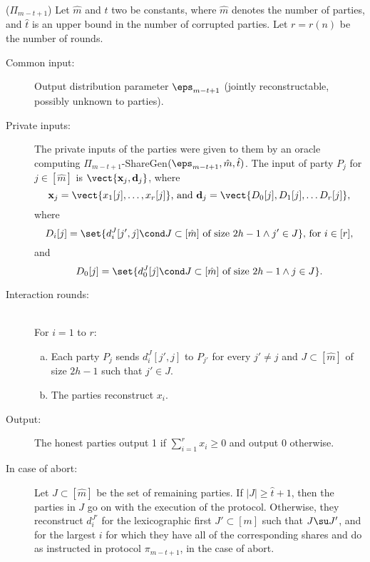 \begin{protocol}($\Pi_{m-t+1}$)\label{protocol:reductionbase}
Let $\hat{m}$ and $\hat{t}$ two be constants, where $\hat{m}$ denotes the number of parties, and $\hat{t}$ is an upper bound in the number of corrupted parties. Let $r=r(n)$ be the number of rounds.
\begin{description}
\item[Common input:] Output distribution parameter $\eps_{m-t+1}$ (jointly reconstructable, possibly unknown to parties).
\item[Private inputs:] The private inputs of the parties were given to them by an oracle computing $\Pi_{m-t+1}$-ShareGen$(\eps_{m-t+1},\hat{m},\hat{t})$.
The input of party $P_j$ for $j\in[\hat{m}]$ is $\vect{\textbf{x}_j,\textbf{d}_j}$, where 
$$\textbf{x}_j=\vect{x_1[j],\ldots,x_r[j]}\text{, and }\textbf{d}_j=\vect{D_0[j],D_1[j],\ldots D_r[j]},$$
where 
$$D_i[j]=\set{d^J_i[j',j]\cond J\subset[\hat{m}]\text{ of size } 2h-1 \wedge j'\in J}\text{, for }i\in[r],$$
 and 
$$D_0[j]=\set{d^J_0[j]\cond J\subset[\hat{m}]\text{ of size }2h-1 \wedge j\in J}.$$
\item[Interaction rounds:]~\\
		For $i=1$ to $r$:
		\begin{enumerate}[(a)]
			\item Each party $P_j$ sends $d^J_i[j',j]$ to $P_{j'}$ for every $j'\ne j$ and $J\subset[\hat{m}]$ of size $2h-1$ such that $j'\in J$.
			\item The parties reconstruct $x_i$.
		\end{enumerate}
	\item[Output:] The honest parties output 1 if $\sum_{i=1}^r {x_i}\geq0$ and output 0 otherwise.
	\item[In case of abort:]
		Let $J\subset[\hat{m}]$ be the set of remaining parties. If $|J|\geq\hat{t}+1$, then the parties in $J$ go on with the execution of the protocol. Otherwise, they reconstruct $d_i^{J'}$ for the lexicographic first $J'\subset[m]$ such that $J\su J'$, and for the largest $i$ for which they have all of the corresponding shares and do as instructed in protocol $\pi_{m-t+1}$, in the case of abort.
\end{description}
\end{protocol}

